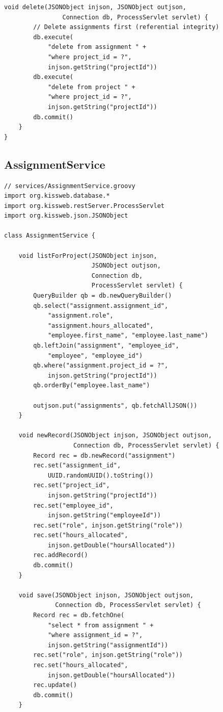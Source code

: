 \begin{lstlisting}[style=groovy]
    void delete(JSONObject injson, JSONObject outjson,
                Connection db, ProcessServlet servlet) {
        // Delete assignments first (referential integrity)
        db.execute(
            "delete from assignment " +
            "where project_id = ?",
            injson.getString("projectId"))
        db.execute(
            "delete from project " +
            "where project_id = ?",
            injson.getString("projectId"))
        db.commit()
    }
}
\end{lstlisting}

\subsection{AssignmentService}

\begin{lstlisting}[style=groovy]
// services/AssignmentService.groovy
import org.kissweb.database.*
import org.kissweb.restServer.ProcessServlet
import org.kissweb.json.JSONObject

class AssignmentService {

    void listForProject(JSONObject injson,
                        JSONObject outjson,
                        Connection db,
                        ProcessServlet servlet) {
        QueryBuilder qb = db.newQueryBuilder()
        qb.select("assignment.assignment_id",
            "assignment.role",
            "assignment.hours_allocated",
            "employee.first_name", "employee.last_name")
        qb.leftJoin("assignment", "employee_id",
            "employee", "employee_id")
        qb.where("assignment.project_id = ?",
            injson.getString("projectId"))
        qb.orderBy("employee.last_name")

        outjson.put("assignments", qb.fetchAllJSON())
    }

    void newRecord(JSONObject injson, JSONObject outjson,
                   Connection db, ProcessServlet servlet) {
        Record rec = db.newRecord("assignment")
        rec.set("assignment_id",
            UUID.randomUUID().toString())
        rec.set("project_id",
            injson.getString("projectId"))
        rec.set("employee_id",
            injson.getString("employeeId"))
        rec.set("role", injson.getString("role"))
        rec.set("hours_allocated",
            injson.getDouble("hoursAllocated"))
        rec.addRecord()
        db.commit()
    }

    void save(JSONObject injson, JSONObject outjson,
              Connection db, ProcessServlet servlet) {
        Record rec = db.fetchOne(
            "select * from assignment " +
            "where assignment_id = ?",
            injson.getString("assignmentId"))
        rec.set("role", injson.getString("role"))
        rec.set("hours_allocated",
            injson.getDouble("hoursAllocated"))
        rec.update()
        db.commit()
    }


\end{lstlisting}
